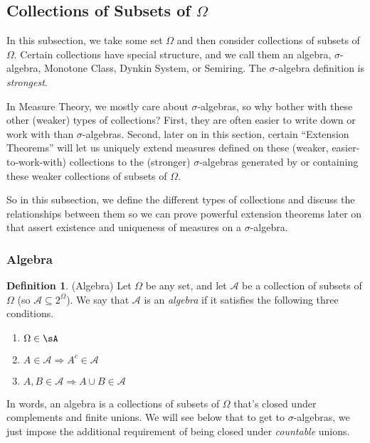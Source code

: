 \documentclass[12pt]{article}
\theoremstyle{plain}
\theoremstyle{definition}
\newtheorem{defn}[thm]{Definition}
\theoremstyle{remark}
\begin{document}
\subsection{Collections of Subsets of $\Omega$}

In this subsection, we take some set $\Omega$ and then consider
collections of subsets of $\Omega$. Certain collections have special
structure, and we call them an algebra, $\sigma$-algebra, Monotone
Class, Dynkin System, or Semiring. The $\sigma$-algebra definition is
\emph{strongest}.

In Measure Theory, we mostly care about $\sigma$-algebras,
so why bother with these other (weaker) types of collections?
First, they are often easier to write down or work with than
$\sigma$-algebras. Second, later on in this section, certain ``Extension
Theorems'' will let us uniquely extend measures defined on these
(weaker, easier-to-work-with) collections to the (stronger)
$\sigma$-algebras generated by or containing these weaker collections of
subsets of $\Omega$.

So in this subsection, we define the different types of collections and
discuss the relationships between them so we can prove powerful
extension theorems later on that assert existence and uniqueness of
measures on a $\sigma$-algebra.

\subsubsection{Algebra}

\begin{defn}
\label{algebra}
(Algebra)
Let $\Omega$ be any set, and let $\mathscr{A}$ be a collection of subsets of
$\Omega$ (so $\mathscr{A}\subseteq2^\Omega$). We say that
$\mathscr{A}$ is an \emph{algebra} if it satisfies the following three
conditions.
\begin{enumerate}
  \item $\Omega\in\sA$
  \item $A\in\mathscr{A}\Rightarrow A^c\in\mathscr{A}$
  \item $A,B\in\mathscr{A} \Rightarrow A\cup B\in\mathscr{A}$
\end{enumerate}
In words, an algebra is a collections of subsets of $\Omega$ that's
closed under complements and finite unions. We will see below that
to get to $\sigma$-algebras, we just impose the additional requirement
of being closed under \emph{countable} unions.
\end{defn}
\end{document}
